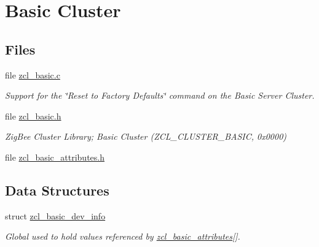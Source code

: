 \hypertarget{group__zcl__basic}{}\section{Basic Cluster}
\label{group__zcl__basic}
\subsection*{Files}
\begin{DoxyCompactItemize}
\item 
file \hyperlink{zcl__basic_8c}{zcl\+\_\+basic.\+c}
\begin{DoxyCompactList}\small\item\em Support for the \char`\"{}\+Reset to Factory Defaults\char`\"{} command on the Basic Server Cluster. \end{DoxyCompactList}\item 
file \hyperlink{zcl__basic_8h}{zcl\+\_\+basic.\+h}
\begin{DoxyCompactList}\small\item\em Zig\+Bee Cluster Library; Basic Cluster (Z\+C\+L\+\_\+\+C\+L\+U\+S\+T\+E\+R\+\_\+\+B\+A\+S\+IC, 0x0000) \end{DoxyCompactList}\item 
file \hyperlink{zcl__basic__attributes_8h}{zcl\+\_\+basic\+\_\+attributes.\+h}
\end{DoxyCompactItemize}
\subsection*{Data Structures}
\begin{DoxyCompactItemize}
\item 
struct \hyperlink{structzcl__basic__dev__info}{zcl\+\_\+basic\+\_\+dev\+\_\+info}
\begin{DoxyCompactList}\small\item\em Global used to hold values referenced by \hyperlink{group__zcl__basic_ga721ebe2f6ae346632475cf178671d150}{zcl\+\_\+basic\+\_\+attributes}\mbox{[}\mbox{]}. \end{DoxyCompactList}\end{DoxyCompactItemize}
